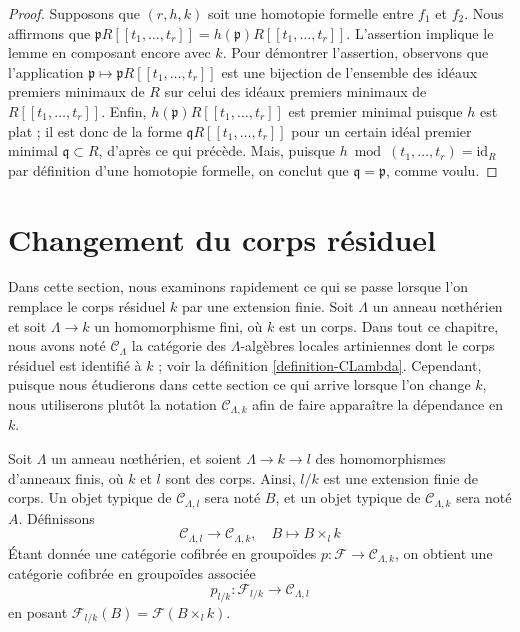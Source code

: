 \begin{proof}
Supposons que $(r, h, k)$ soit une homotopie formelle entre $f_1$ et $f_2$.
Nous affirmons que
$\mathfrak pR[[t_1, \ldots, t_r]] = h(\mathfrak p)R[[t_1, \ldots, t_r]]$.
L'assertion implique le lemme en composant encore avec $k$. Pour démontrer
l'assertion, observons que l'application
$\mathfrak p \mapsto \mathfrak pR[[t_1, \ldots, t_r]]$
est une bijection de l'ensemble des idéaux premiers minimaux de $R$ sur celui
des idéaux premiers minimaux de $R[[t_1, \ldots, t_r]]$. Enfin,
$h(\mathfrak p)R[[t_1, \ldots, t_r]]$ est premier minimal puisque $h$ est
plat ; il est donc de la forme $\mathfrak q R[[t_1, \ldots, t_r]]$ pour un
certain idéal premier minimal $\mathfrak q \subset R$, d'après ce qui précède.
Mais, puisque $h \bmod (t_1, \ldots, t_r) = \text{id}_R$ par définition d'une
homotopie formelle, on conclut que $\mathfrak q = \mathfrak p$, comme voulu.
\end{proof}











\section{Changement du corps résiduel}
\label{section-change-of-field}

\noindent
Dans cette section, nous examinons rapidement ce qui se passe lorsque l'on
remplace le corps résiduel $k$ par une extension finie. Soit $\Lambda$ un
anneau nœthérien et soit $\Lambda \to k$ un homomorphisme fini, où $k$ est un
corps. Dans tout ce chapitre, nous avons noté $\mathcal{C}_\Lambda$ la
catégorie des $\Lambda$-algèbres locales artiniennes dont le corps résiduel est
identifié à $k$ ; voir la définition \ref{definition-CLambda}. Cependant,
puisque nous étudierons dans cette section ce qui arrive lorsque l'on change
$k$, nous utiliserons plutôt la notation $\mathcal{C}_{\Lambda, k}$ afin de
faire apparaître la dépendance en $k$.

\begin{situation}
\label{situation-change-of-fields}
Soit $\Lambda$ un anneau nœthérien, et soient $\Lambda \to k \to l$ des
homomorphismes d'anneaux finis, où $k$ et $l$ sont des corps. Ainsi, $l/k$ est
une extension finie de corps. Un objet typique de
$\mathcal{C}_{\Lambda, l}$ sera noté $B$, et un objet typique de
$\mathcal{C}_{\Lambda, k}$ sera noté $A$. Définissons
\begin{equation}
\label{equation-comparison}
\mathcal{C}_{\Lambda, l} \longrightarrow \mathcal{C}_{\Lambda, k},
\quad
B \longmapsto B \times_l k
\end{equation}
Étant donnée une catégorie cofibrée en groupoïdes
$p : \mathcal{F} \to \mathcal{C}_{\Lambda, k}$, on obtient une catégorie
cofibrée en groupoïdes associée
$$
p_{l/k} : \mathcal{F}_{l/k} \longrightarrow \mathcal{C}_{\Lambda, l}
$$
en posant $\mathcal{F}_{l/k}(B) = \mathcal{F}(B \times_l k)$.
\end{situation}

